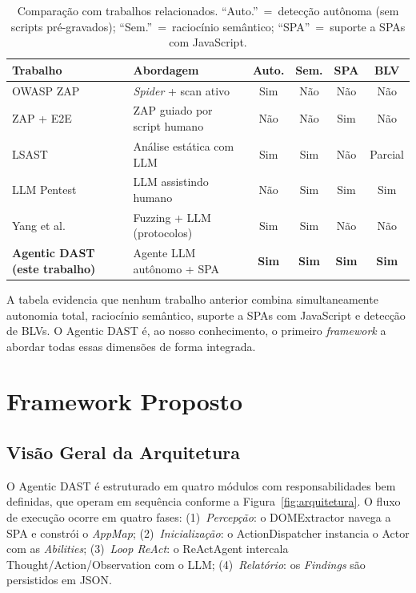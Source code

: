 \documentclass[
    10pt,
    twocolumn,
    a4paper
]{article}
\begin{document}
\begin{table}[!htb]
\centering
\caption{Comparação com trabalhos relacionados. ``Auto.''~=~detecção
autônoma (sem scripts pré-gravados); ``Sem.''~=~raciocínio semântico;
``SPA''~=~suporte a SPAs com JavaScript.\label{tab:relacionados}}
\small
\begin{tabularx}{\textwidth}{lXcccc}
\toprule
\textbf{Trabalho} & \textbf{Abordagem} & \textbf{Auto.} & \textbf{Sem.} & \textbf{SPA} & \textbf{BLV} \\
\midrule
OWASP ZAP \cite{owaspzap}
  & \textit{Spider} + scan ativo & Sim & Não & Não & Não \\
ZAP + E2E \cite{stackhawk2024}
  & ZAP guiado por script humano & Não & Não & Sim & Não \\
LSAST \cite{lsast2024}
  & Análise estática com LLM & Sim & Sim & Não & Parcial \\
LLM Pentest \cite{pentest2024llm}
  & LLM assistindo humano & Não & Sim & Sim & Sim \\
Yang et al. \cite{yang2025hybrid}
  & Fuzzing + LLM (protocolos) & Sim & Sim & Não & Não \\
\midrule
\textbf{Agentic DAST (este trabalho)}
  & Agente LLM autônomo + SPA & \textbf{Sim} & \textbf{Sim} & \textbf{Sim} & \textbf{Sim} \\
\bottomrule
\end{tabularx}
\end{table}

A tabela evidencia que nenhum trabalho anterior combina simultaneamente
autonomia total, raciocínio semântico, suporte a SPAs com JavaScript e
detecção de BLVs. O Agentic DAST é, ao nosso conhecimento, o primeiro
\textit{framework} a abordar todas essas dimensões de forma integrada.

\section{Framework Proposto}
\label{sec:framework}

\subsection{Visão Geral da Arquitetura}

O Agentic DAST é estruturado em quatro módulos com responsabilidades
bem definidas, que operam em sequência conforme a
Figura~\ref{fig:arquitetura}. O fluxo de execução ocorre em quatro
fases: (1)~\textit{Percepção}: o DOMExtractor navega a SPA e constrói
o \textit{AppMap}; (2)~\textit{Inicialização}: o ActionDispatcher
instancia o Actor com as \textit{Abilities}; (3)~\textit{Loop ReAct}:
o ReActAgent intercala Thought/Action/Observation com o LLM;
(4)~\textit{Relatório}: os \textit{Findings} são persistidos em JSON.
\end{document}
